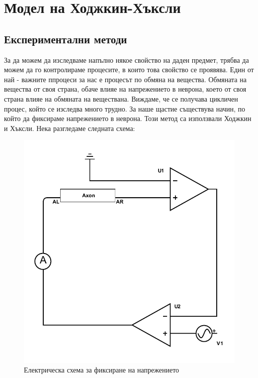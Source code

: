 \documentclass{article}
\numberwithin{equation}{section}
\begin{document}
\section{Модел на Ходжкин-Хъксли}
    \subsection[Експериментални методи]{Експериментални методи}
        За да можем да изследваме напълно някое свойство на даден предмет, трябва да можем да го контролираме процесите, в които това
        свойство се проявява.  Един от най - важните ппроцеси за нас е процесът по обмяна на вещества.  Обмяната на вещества от своя страна,
        обаче влияе на напрежението в неврона, което от своя страна влияе на обмяната на веществана. Виждаме, че се получава цикличен
        процес, който се изследва много трудно. За наше щастие съществува начин, по който да фиксираме напрежението в неврона. Този метод са
        използвали Ходжкин и Хъксли. Нека разгледаме следната схема:

        \begin{figure}[H]
            \centering
            \includegraphics[scale=0.6]{./schemas/voltage-clamp.pdf}
            \caption{Електрическа схема за фиксиране на напрежението}
        \end{figure}
\end{document}
